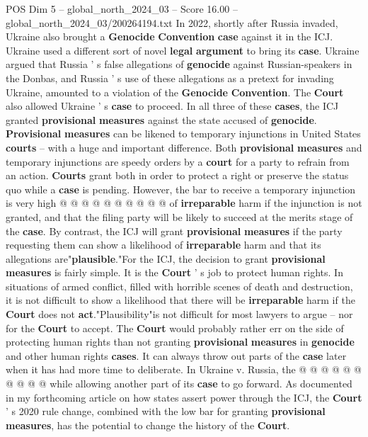 \begin{textsample}{POS Dim 5 – global\_north\_2024\_03 – Score 16.00 – global\_north\_2024\_03/200264194.txt}
In 2022, shortly after Russia invaded, Ukraine also brought a \textbf{Genocide} \textbf{Convention} \textbf{case} against it in the ICJ.
Ukraine used a different sort of novel \textbf{legal} \textbf{argument} to bring its \textbf{case}.
Ukraine argued that Russia ' s false allegations of \textbf{genocide} against Russian-speakers in the Donbas, and Russia ' s use of these allegations as a pretext for invading Ukraine, amounted to a violation of the \textbf{Genocide} \textbf{Convention}.
The \textbf{Court} also allowed Ukraine ' s \textbf{case} to proceed.
In all three of these \textbf{cases}, the ICJ granted \textbf{provisional} \textbf{measures} against the state accused of \textbf{genocide}. \textbf{Provisional} \textbf{measures} can be likened to temporary injunctions in United States \textbf{courts} -- with a huge and important difference.
Both \textbf{provisional} \textbf{measures} and temporary injunctions are speedy orders by a \textbf{court} for a party to refrain from an action. \textbf{Courts} grant both in order to protect a right or preserve the status quo while a \textbf{case} is pending.
However, the bar to receive a temporary injunction is very high @ @ @ @ @ @ @ @ @ @ of \textbf{irreparable} harm if the injunction is not granted, and that the filing party will be likely to succeed at the merits stage of the \textbf{case}.
By contrast, the ICJ will grant \textbf{provisional} \textbf{measures} if the party requesting them can show a likelihood of \textbf{irreparable} harm and that its allegations are"\textbf{plausible}."For the ICJ, the decision to grant \textbf{provisional} \textbf{measures} is fairly simple.
It is the \textbf{Court} ' s job to protect human rights.
In situations of armed conflict, filled with horrible scenes of death and destruction, it is not difficult to show a likelihood that there will be \textbf{irreparable} harm if the \textbf{Court} does not \textbf{act}."Plausibility"is not difficult for most lawyers to argue -- nor for the \textbf{Court} to accept.
The \textbf{Court} would probably rather err on the side of protecting human rights than not granting \textbf{provisional} \textbf{measures} in \textbf{genocide} and other human rights \textbf{cases}.
It can always throw out parts of the \textbf{case} later when it has had more time to deliberate.
In Ukraine v.
Russia, the @ @ @ @ @ @ @ @ @ @ while allowing another part of its \textbf{case} to go forward.
As documented in my forthcoming article on how states assert power through the ICJ, the \textbf{Court} ' s 2020 rule change, combined with the low bar for granting \textbf{provisional} \textbf{measures}, has the potential to change the history of the \textbf{Court}.

\end{textsample}
